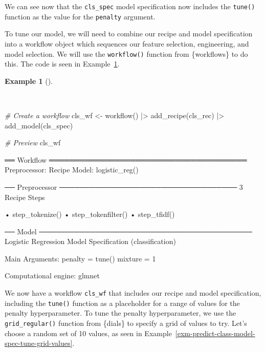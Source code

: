 \documentclass[
  letterpaper,
]{latex/krantz}
\newenvironment{Shaded}{\begin{snugshade}}{\end{snugshade}}
\newcommand{\CommentTok}[1]{\textcolor[rgb]{0.00,0.00,0.00}{\textit{#1}}}
\newcommand{\FunctionTok}[1]{\textcolor[rgb]{0.00,0.00,0.00}{#1}}
\newcommand{\NormalTok}[1]{\textcolor[rgb]{0.00,0.00,0.00}{#1}}
\newcommand{\OtherTok}[1]{\textcolor[rgb]{0.00,0.00,0.00}{#1}}
\newcommand{\SpecialCharTok}[1]{\textcolor[rgb]{0.00,0.00,0.00}{#1}}
\theoremstyle{definition}
\newtheorem{example}{Example}[chapter]
\theoremstyle{remark}
\begin{document}
We can see now that the \texttt{cls\_spec} model specification now
includes the \texttt{tune()} function as the value for the
\texttt{penalty} argument.

To tune our model, we will need to combine our recipe and model
specification into a workflow object which sequences our feature
selection, engineering, and model selection. We will use the
\texttt{workflow()} function from \{workflows\} to do this. The code is
seen in Example~\ref{exm-predict-class-workflow}.

\begin{example}[]\protect\hypertarget{exm-predict-class-workflow}{}\label{exm-predict-class-workflow}

~

\begin{Shaded}
\begin{Highlighting}[]
\CommentTok{\# Create a workflow}
\NormalTok{cls\_wf }\OtherTok{\textless{}{-}}
  \FunctionTok{workflow}\NormalTok{() }\SpecialCharTok{|\textgreater{}}
  \FunctionTok{add\_recipe}\NormalTok{(cls\_rec) }\SpecialCharTok{|\textgreater{}}
  \FunctionTok{add\_model}\NormalTok{(cls\_spec)}

\CommentTok{\# Preview}
\NormalTok{cls\_wf}
\end{Highlighting}
\end{Shaded}

\begin{Shaded}
\begin{Highlighting}[]
\NormalTok{══ Workflow ═══════════════════════════════════════}
\NormalTok{Preprocessor: Recipe}
\NormalTok{Model: logistic\_reg()}

\NormalTok{── Preprocessor ───────────────────────────────────}
\NormalTok{3 Recipe Steps}

\NormalTok{• step\_tokenize()}
\NormalTok{• step\_tokenfilter()}
\NormalTok{• step\_tfidf()}

\NormalTok{── Model ──────────────────────────────────────────}
\NormalTok{Logistic Regression Model Specification (classification)}

\NormalTok{Main Arguments:}
\NormalTok{  penalty = tune()}
\NormalTok{  mixture = 1}

\NormalTok{Computational engine: glmnet}
\end{Highlighting}
\end{Shaded}

\end{example}

We now have a workflow \texttt{cls\_wf} that includes our recipe and
model specification, including the \texttt{tune()} function as a
placeholder for a range of values for the penalty hyperparameter. To
tune the penalty hyperparameter, we use the \texttt{grid\_regular()}
function from \{dials\} to specify a grid of values to try. Let's choose
a random set of 10 values, as seen in
Example~\ref{exm-predict-class-model-spec-tune-grid-values}.
\end{document}
